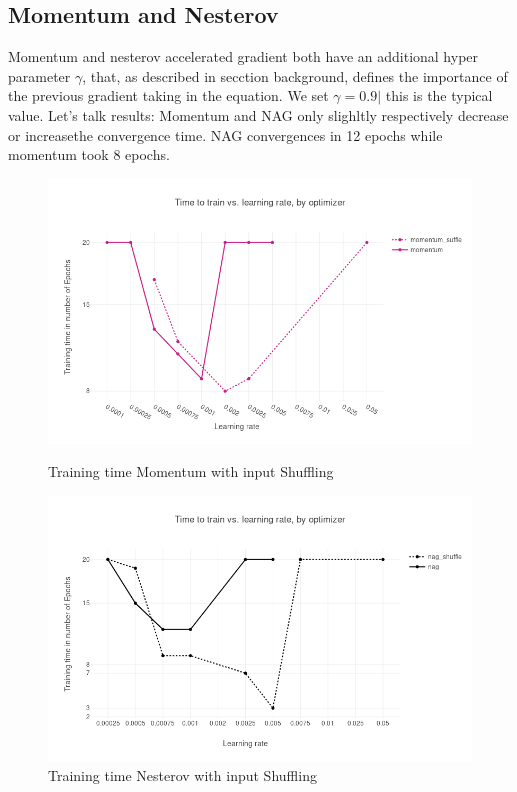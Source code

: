 \subsection{Momentum and Nesterov}
Momentum and nesterov accelerated gradient both have an additional hyper parameter $\gamma$, that, as described in secction background, defines the importance of the previous gradient taking in the equation. We set $\gamma = 0.9|$ this is the typical value. Let's talk results: Momentum and NAG only slighltly respectively decrease or increasethe convergence time. NAG convergences in 12 epochs while momentum took 8 epochs. 
\begin{figure}[h]
\centering
\begin{minipage}{.5\textwidth}
  \centering
  	\includegraphics[scale=0.3]{images/results_mom_shuffle} 
    \caption{Training time  Momentum with input Shuffling}
    \label{fig:results_mom}
  \label{fig:test1}
\end{minipage}%
\begin{minipage}{.5\textwidth}
  \centering
	\includegraphics[scale=0.3]{images/results_nag_shuffle} 
    \caption{Training time  Nesterov with input Shuffling}
    \label{fig:results_mom}
\end{minipage}
\end{figure}
